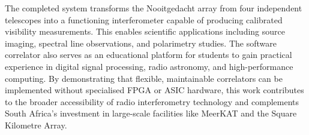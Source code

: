 The completed system transforms the Nooitgedacht array from four independent telescopes into a functioning interferometer capable of producing calibrated visibility measurements. This enables scientific applications including source imaging, spectral line observations, and polarimetry studies. The software correlator also serves as an educational platform for students to gain practical experience in digital signal processing, radio astronomy, and high-performance computing. By demonstrating that flexible, maintainable correlators can be implemented without specialised FPGA or ASIC hardware, this work contributes to the broader accessibility of radio interferometry technology and complements South Africa's investment in large-scale facilities like MeerKAT and the Square Kilometre Array.